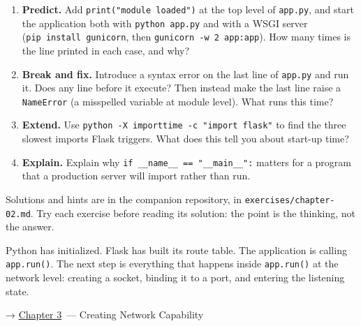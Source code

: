 \begin{enumerate}
\def\labelenumi{\arabic{enumi}.}
\tightlist
\item
  \textbf{Predict.} Add \texttt{print("module\ loaded")} at the top level of \texttt{app.py}, and start the application both with \texttt{python\ app.py} and with a WSGI server (\texttt{pip\ install\ gunicorn}, then \texttt{gunicorn\ -w\ 2\ app:app}). How many times is the line printed in each case, and why?
\item
  \textbf{Break and fix.} Introduce a syntax error on the last line of \texttt{app.py} and run it. Does any line before it execute? Then instead make the last line raise a \texttt{NameError} (a misspelled variable at module level). What runs this time?
\item
  \textbf{Extend.} Use \texttt{python\ -}\allowbreak{}\texttt{X\ importtime\ -}\allowbreak{}\texttt{c\ "import\ flask"} to find the three slowest imports Flask triggers. What does this tell you about start-up time?
\item
  \textbf{Explain.} Explain why \texttt{if\ \_}\allowbreak{}\texttt{\_}\allowbreak{}\texttt{name\_}\allowbreak{}\texttt{\_}\allowbreak{}\texttt{\ =}\allowbreak{}\texttt{=}\allowbreak{}\texttt{\ "\_}\allowbreak{}\texttt{\_}\allowbreak{}\texttt{main\_}\allowbreak{}\texttt{\_}\allowbreak{}\texttt{":} matters for a program that a production server will import rather than run.
\end{enumerate}

\noindent{}Solutions and hints are in the companion repository, in \texttt{exercises/}\allowbreak{}\texttt{chapter-02.md}. Try each exercise before reading its solution: the point is the thinking, not the answer.

\label{02-runtime-initialization:whats-next}

Python has initialized. Flask has built its route table. The application is calling \texttt{app.run()}. The next step is everything that happens inside \texttt{app.run()} at the network level: creating a socket, binding it to a port, and entering the listening state.

\noindent{}→ \hyperref[ch:03-network-capability]{Chapter 3}~--- Creating Network Capability
